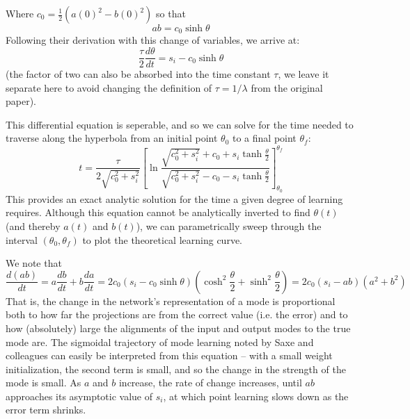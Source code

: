 \documentclass{article}
\begin{document}
Where $c_0 = \frac{1}{2} (a(0)^2-b(0)^2)$ so that
$$ab = c_0 \sinh \theta$$
Following their derivation with this change of variables, we arrive at:
$$\frac{\tau}{2} \frac{d\theta}{dt} = s_i - c_0 \sinh \theta$$
(the factor of two can also be absorbed into the time constant $\tau$, we leave it separate here to avoid changing the definition of $\tau = 1/\lambda$ from the original paper). \par
This differential equation is seperable, and so we can solve for the time needed to traverse along the hyperbola from an initial point $\theta_0$ to a final point $\theta_f$:
$$t = \frac{\tau}{2\sqrt{c_0^2 + s_i^2}} \left[\ln \frac{\sqrt{c_0^2 + s_i^2} + c_0 + s_i \tanh \frac{\theta}{2}}{\sqrt{c_0^2 + s_i^2} - c_0 - s_i \tanh \frac{\theta}{2}}\right]_{\theta_0}^{\theta_f}$$
This provides an exact analytic solution for the time a given degree of learning requires. Although this equation cannot be analytically inverted to find $\theta(t)$ (and thereby $a(t)$ and $b(t)$), we can parametrically sweep through the interval $(\theta_0, \theta_f)$ to plot the theoretical learning curve. \par
We note that 
$$\frac{d(ab)}{dt} = a \frac{db}{dt} + b \frac{da}{dt} = 2 c_0 (s_i - c_0 \sinh \theta) \left( \cosh^2 \frac{\theta}{2} + \sinh^2 \frac{\theta}{2} \right) = 2 c_0 \left(s_i - ab\right) \left(a^2 + b^2 \right)$$
That is, the change in the network's representation of a mode is proportional both to how far the projections are from the correct value (i.e. the error) and to how (absolutely) large the alignments of the input and output modes to the true mode are. The sigmoidal trajectory of mode learning noted by Saxe and colleagues can easily be interpreted from this equation -- with a small weight initialization, the second term is small, and so the change in the strength of the mode is small. As $a$ and $b$ increase, the rate of change increases, until $ab$ approaches its asymptotic value of $s_i$, at which point learning slows down as the error term shrinks. \par
\end{document}
